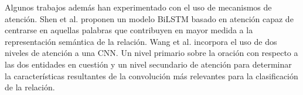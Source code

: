 


%


Algunos trabajos además han experimentado con el uso de mecanismos de atención. Shen et al. \cite{huang2016attention} proponen un modelo BiLSTM basado en atención capaz de centrarse en aquellas palabras que contribuyen en mayor medida a la representación semántica de la relación. Wang et al. \cite{wang2016multilevel} incorpora el uso de dos niveles de atención a una CNN. Un nivel primario sobre la oración con respecto a las dos entidades en cuestión y un nivel secundario de atención para determinar la características resultantes de la convolución más relevantes para la clasificación de la relación.     


